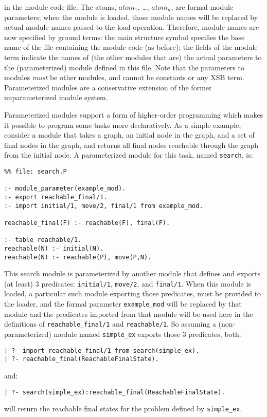 \noindent in the module code file.  The atoms, $atom_1$, \ldots,
$atom_n$, are formal module parameters; when the module is loaded,
those module names will be replaced by actual module names passed to
the load operation.  Therefore, module names are now specified by
ground terms: the main structure symbol specifies the base name of the
file containing the module code (as before); the fields of the module
term indicate the names of (the other modules that are) the actual
parameters to the (parameterized) module defined in this file.  Note
that the parameters to modules {\em must} be other modules, and cannot
be constants or any XSB term.  Parameterized modules are a
conservative extension of the former unparameterized module system.

Parameterized modules support a form of higher-order programming which
makes it possible to program some tasks more declaratively.  As a
simple example, consider a module that takes a graph, an initial node
in the graph, and a set of final nodes in the graph, and returns all
final nodes reachable through the graph from the initial node.  A
parameterized module for this task, named {\tt search}, is:
\begin{verbatim}
%% file: search.P

:- module_parameter(example_mod).
:- export reachable_final/1.
:- import initial/1, move/2, final/1 from example_mod.

reachable_final(F) :- reachable(F), final(F).

:- table reachable/1.
reachable(N) :- initial(N).
reachable(N) :- reachable(P), move(P,N).
\end{verbatim}
This search module is parameterized by another module that defines and
exports (at least) 3 predicates: {\tt initial/1}, {\tt move/2}, and
{\tt final/1}.  When this module is loaded, a particular such module
exporting those predicates, must be provided to the loader, and the
formal parameter {\tt example\_mod} will be replaced by that module and
the predicates imported from that module will be used here in the
definitions of {\tt reachable\_final/1} and {\tt reachable/1}.  So
assuming a (non-parameterized) module named {\tt simple\_ex} exports
those 3 predicates, both:
\begin{verbatim}
| ?- import reachable_final/1 from search(simple_ex).
| ?- reachable_final(ReachableFinalState).
\end{verbatim}
and:
\begin{verbatim}
| ?- search(simple_ex):reachable_final(ReachableFinalState).
\end{verbatim}
will return the reachable final states for the problem defined by
{\tt simple\_ex}.

